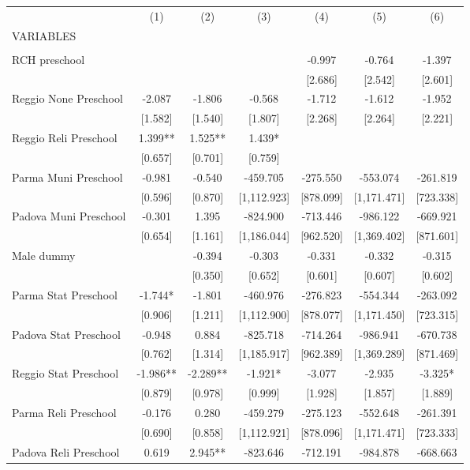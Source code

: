 \begin{tabular}{lcccccc} \hline
 & (1) & (2) & (3) & (4) & (5) & (6) \\
VARIABLES &  &  &  &  &  &  \\ \hline
 &  &  &  &  &  &  \\
RCH preschool &  &  &  & -0.997 & -0.764 & -1.397 \\
 &  &  &  & [2.686] & [2.542] & [2.601] \\
Reggio None Preschool & -2.087 & -1.806 & -0.568 & -1.712 & -1.612 & -1.952 \\
 & [1.582] & [1.540] & [1.807] & [2.268] & [2.264] & [2.221] \\
Reggio Reli Preschool & 1.399** & 1.525** & 1.439* &  &  &  \\
 & [0.657] & [0.701] & [0.759] &  &  &  \\
Parma Muni Preschool & -0.981 & -0.540 & -459.705 & -275.550 & -553.074 & -261.819 \\
 & [0.596] & [0.870] & [1,112.923] & [878.099] & [1,171.471] & [723.338] \\
Padova Muni Preschool & -0.301 & 1.395 & -824.900 & -713.446 & -986.122 & -669.921 \\
 & [0.654] & [1.161] & [1,186.044] & [962.520] & [1,369.402] & [871.601] \\
Male dummy &  & -0.394 & -0.303 & -0.331 & -0.332 & -0.315 \\
 &  & [0.350] & [0.652] & [0.601] & [0.607] & [0.602] \\
Parma Stat Preschool & -1.744* & -1.801 & -460.976 & -276.823 & -554.344 & -263.092 \\
 & [0.906] & [1.211] & [1,112.900] & [878.077] & [1,171.450] & [723.315] \\
Padova Stat Preschool & -0.948 & 0.884 & -825.718 & -714.264 & -986.941 & -670.738 \\
 & [0.762] & [1.314] & [1,185.917] & [962.389] & [1,369.289] & [871.469] \\
Reggio Stat Preschool & -1.986** & -2.289** & -1.921* & -3.077 & -2.935 & -3.325* \\
 & [0.879] & [0.978] & [0.999] & [1.928] & [1.857] & [1.889] \\
Parma Reli Preschool & -0.176 & 0.280 & -459.279 & -275.123 & -552.648 & -261.391 \\
 & [0.690] & [0.858] & [1,112.921] & [878.096] & [1,171.471] & [723.333] \\
Padova Reli Preschool & 0.619 & 2.945** & -823.646 & -712.191 & -984.878 & -668.663 \\

\end{tabular}

